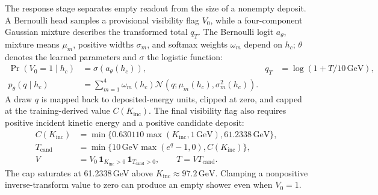 \documentclass[11pt]{article}
\newcommand{\GeV}{\,\mathrm{GeV}}
\newcommand{\Kinc}{K_{\mathrm{inc}}}
\begin{document}
The response stage separates empty readout from the size of a nonempty deposit. A Bernoulli head samples a provisional visibility flag $V_0$, while a four-component Gaussian mixture describes the transformed total $q_T$. The Bernoulli logit $a_\theta$, mixture means $\mu_m$, positive widths $\sigma_m$, and softmax weights $\omega_m$ depend on $h_c$; $\theta$ denotes the learned parameters and $\sigma$ the logistic function:
\begin{equation}
 \begin{aligned}
 \Pr(V_0=1\mid h_c)&=\sigma(a_\theta(h_c)),
 &q_T&=\log(1+T/10\GeV),\\
 p_\theta(q\mid h_c)&=\sum_{m=1}^{4}\omega_m(h_c)
 \mathcal N\!\left(q;\mu_m(h_c),\sigma_m^2(h_c)\right).
 \end{aligned}
 \label{eq:response_transform}
\end{equation}
A draw $q$ is mapped back to deposited-energy units, clipped at zero, and capped at the training-derived value $C(\Kinc)$. The final visibility flag also requires positive incident kinetic energy and a positive candidate deposit:
\begin{equation}
 \begin{aligned}
 C(\Kinc)&=\min\{0.630110\max(\Kinc,1\GeV),61.2338\GeV\},\\
 T_{\mathrm{cand}}&=\min\{10\GeV\max(e^q-1,0),C(\Kinc)\},\\
 V&=V_0\,\mathbf 1_{\Kinc>0}\,\mathbf 1_{T_{\mathrm{cand}}>0},
 \qquad T=VT_{\mathrm{cand}}.
 \end{aligned}
 \label{eq:cap}
\end{equation}
The cap saturates at 61.2338\,GeV above $\Kinc\approx97.2\GeV$. Clamping a nonpositive inverse-transform value to zero can produce an empty shower even when $V_0=1$.
\end{document}
